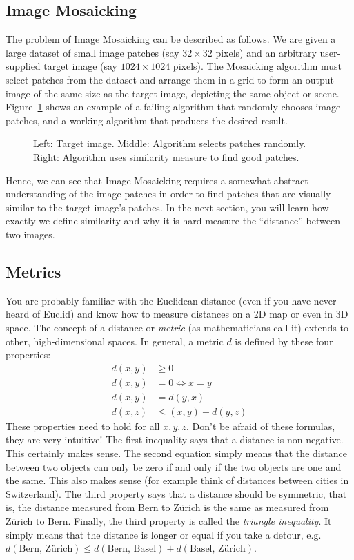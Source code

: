 \documentclass[]{article}
\begin{document}
	\subsection{Image Mosaicking}
		The problem of Image Mosaicking can be described as follows.
		We are given a large dataset of small image patches (say $32 \times 32$ pixels) and an arbitrary user-supplied target image (say $1024 \times 1024$ pixels).
		The Mosaicking algorithm must select patches from the dataset and arrange them in a grid to form an output image of the same size as the target image, depicting the same object or scene.
		Figure~\ref{fig:mosaicking-working-and-not-working} shows an example of a failing algorithm that randomly chooses image patches, and a working algorithm that produces the desired result.
		\begin{figure}
			\caption{
				Left: Target image. 
				Middle: Algorithm selects patches randomly. 
				Right: Algorithm uses similarity measure to find good patches.
			}
			\label{fig:mosaicking-working-and-not-working}
		\end{figure}
		Hence, we can see that Image Mosaicking requires a somewhat abstract understanding of the image patches in order to find patches that are visually similar to the target image's patches.
		In the next section, you will learn how exactly we define similarity and why it is hard measure the ``distance'' between two images.
		
	\subsection{Metrics}
		You are probably familiar with the Euclidean distance (even if you have never heard of Euclid) and know how to measure distances on a 2D map or even in 3D space. 
		The concept of a distance or \emph{metric} (as mathematicians call it) extends to other, high-dimensional spaces.
		In general, a metric $d$ is defined by these four properties:
		\begin{align}
			d(x, y) &\geq 0 \\
			d(x, y) &= 0 \iff x = y \\
			d(x, y) &= d(y, x) \\
			d(x, z) &\leq (x, y) + d(y, z) 
		\end{align}
		These properties need to hold for all $x, y, z$.
		Don't be afraid of these formulas, they are very intuitive!
		The first inequality says that a distance is non-negative. 
		This certainly makes sense.
		The second equation simply means that the distance between two objects can only be zero if and only if the two objects are one and the same.
		This also makes sense (for example think of distances between cities in Switzerland).
		The third property says that a distance should be symmetric, that is, the distance measured from Bern to Z\"urich is the same as measured from Z\"urich to Bern.
		Finally, the third property is called the \emph{triangle inequality}. 
		It simply means that the distance is longer or equal if you take a detour, e.g.\@ 
		$d(\text{Bern, Z\"urich}) \leq d(\text{Bern, Basel}) + d(\text{Basel, Z\"urich})$.
		
\end{document}

